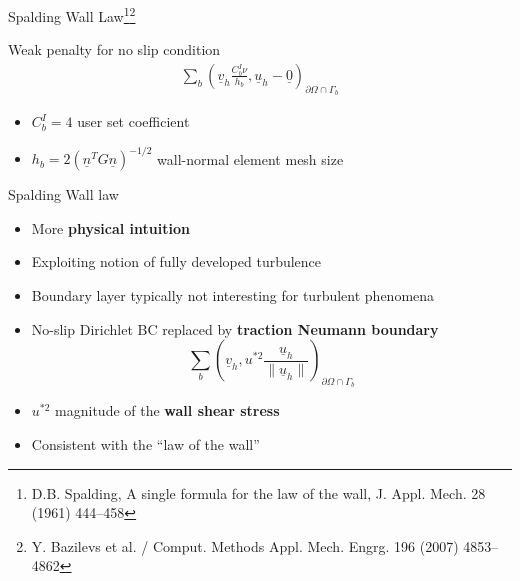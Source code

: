 \documentclass[9pt,compress,t,aspectratio=169]{beamer}
\newcommand{\scprb}[2]{\sum_b \left(#1,#2\right)_{\partial\Omega \cap \Gamma_b }}
\newcommand{\ww}[1]{\underline{#1}}
\newcommand{\1}{\begin{pmatrix}
		1\\
		1
\end{pmatrix}}
\renewcommand{\vec}[1]{\ww{#1}}
\newcommand{\highlight}[1]{\textbf{\color{bluemathlab}#1}}
\newcommand{\highlightB}[1]{\textbf{\color{black!15!orangemathlab}#1}}
\begin{document}
\begin{frame}{Spalding Wall Law\footnote{D.B. Spalding, A single formula for the law of the wall, J. Appl. Mech. 28 (1961) 444--458}\footnote{Y. Bazilevs et al. / Comput. Methods Appl. Mech. Engrg. 196 (2007) 4853--4862}}
	\begin{minipage}{0.49\textwidth}
		\begin{block}{Weak penalty for no slip condition}
			\begin{align*}
				\scprb{\vec{v}_h \frac{C_b^I \nu}{h_b}}{\vec{u}_h-\vec{0}}
			\end{align*}
		\begin{itemize}
			\item $C_b^I=4$ user set coefficient
			\item $h_b=2\left(\vec{n}^T G\vec{n}\right)^{-1/2}$ wall-normal element mesh size
		\end{itemize}
		\end{block}
	\end{minipage}\hfill
	\begin{minipage}{0.49\textwidth}
		\begin{block}{Spalding Wall law}
			\begin{itemize}
				\item More \highlight{physical intuition}
				\item Exploiting notion of fully developed turbulence
				\item Boundary layer typically not interesting for turbulent phenomena
				\item No-slip Dirichlet BC replaced by \highlightB{traction Neumann boundary}
		\begin{equation*}
			\scprb{\vec{v}_h}{u^{*2}\frac{\vec{u}_h}{\lVert \vec{u}_h \rVert}}
		\end{equation*}
				\item $u^{*2}$ magnitude of the \highlight{wall shear stress}
				\item Consistent with the ``law of the wall''
			\end{itemize}
		\end{block}	
\end{minipage}
\end{frame}
\end{document}
